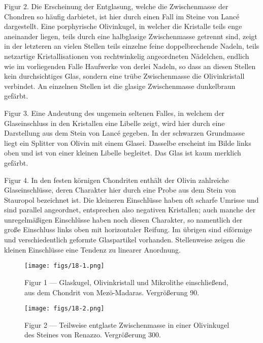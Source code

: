 \documentclass[a4paper, 11pt, oneside, polutonikogreek, german]{article}
\begin{document}
Figur 2. Die Erscheinung der Entglasung, welche die Zwischenmasse der Chondren so häufig darbietet, ist hier durch einen Fall im Steine von Lancé dargestellt. Eine porphyrische Olivinkugel, in welcher die Kristalle teils enge aneinander liegen, teils durch eine halbglasige Zwischenmasse getrennt sind, zeigt in der letzteren an vielen Stellen teils einzelne feine doppelbrechende Nadeln, teils netzartige Kristallisationen von rechtwinkelig angeordneten Nädelchen, endlich wie im vorliegenden Falle Haufwerke von derlei Nadeln, so dass an diesen Stellen kein durchsichtiges Glas, sondern eine trübe Zwischenmasse die Olivinkristall verbindet. An einzelnen Stellen ist die glasige Zwischenmasse dunkelbraun gefärbt.

Figur 3. Eine Andeutung des ungemein seltenen Falles, in welchem der Glaseinschluss in den Kristallen eine Libelle zeigt, wird hier durch eine Darstellung aus dem Stein von Lancé gegeben. In der schwarzen Grundmasse liegt ein Splitter von Olivin mit einem Glasei. Dasselbe erscheint im Bilde links oben und ist von einer kleinen Libelle begleitet. Das Glas ist kaum merklich gefärbt.

Figur 4. In den festen körnigen Chondriten enthält der Olivin zahlreiche Glaseinschlüsse, deren Charakter hier durch eine Probe aus dem Stein von Stauropol bezeichnet ist. Die kleineren Einschlüsse haben oft scharfe Umrisse und sind parallel angeordnet, entsprechen also negativen Kristallen; auch manche der unregelmäßigen Einschlüsse haben noch diesen Charakter, so namentlich der große Einschluss links oben mit horizontaler Reifung. Im übrigen sind eiförmige und verschiedentlich geformte Glaspartikel vorhanden. Stellenweise zeigen die kleinen Einschlüsse eine Tendenz zu linearer Anordnung.
\clearpage

\vspace*{\fill}
\begin{figure}[H]
\centering
\texttt{[image: figs/18-1.png]}
\caption{\small Figur 1 --- Glaskugel, Olivinkristall und Mikrolithe einschließend, aus dem Chondrit von Mezö-Madaras. Vergrößerung 90.}
\end{figure}
\vspace*{\fill}
\clearpage

\vspace*{\fill}
\begin{figure}[H]
\centering
\texttt{[image: figs/18-2.png]}
\caption{\small Figur 2 --- Teilweise entglaste Zwischenmasse in einer Olivinkugel des Steines von Renazzo. Vergrößerung 300.}
\end{figure}
\vspace*{\fill}
\clearpage
\end{document}
